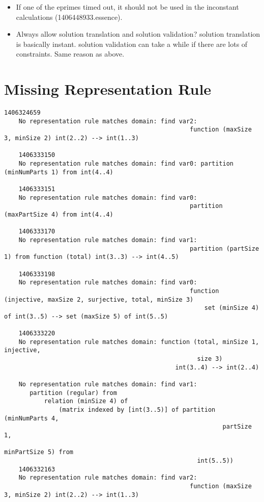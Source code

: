 \begin{itemize}
	\item If one of the eprimes timed out, it should not be used in the inconstant calculations (1406448933.essence).
	\item Always allow solution translation and solution validation?  solution translation is basically instant. solution validation can take a while if there are lots of constraints.  Same reason as above. 
\end{itemize}

\section{Missing Representation Rule}

\begin{lstlisting}[breaklines=True]
	1406324659
    No representation rule matches domain: find var2:
                                                   function (maxSize 3, minSize 2) int(2..2) --> int(1..3)

    1406333150
    No representation rule matches domain: find var0: partition (minNumParts 1) from int(4..4)

    1406333151
    No representation rule matches domain: find var0:
                                                   partition (maxPartSize 4) from int(4..4)

    1406333170
    No representation rule matches domain: find var1:
                                                   partition (partSize 1) from function (total) int(3..3) --> int(4..5)

    1406333198												   
    No representation rule matches domain: find var0:
                                                   function (injective, maxSize 2, surjective, total, minSize 3)
                                                       set (minSize 4) of int(3..5) --> set (maxSize 5) of int(5..5)

    1406333220
    No representation rule matches domain: function (total, minSize 1, injective,
                                                     size 3)
                                               int(3..4) --> int(2..4)

    No representation rule matches domain: find var1:
       partition (regular) from
           relation (minSize 4) of
               (matrix indexed by [int(3..5)] of partition (minNumParts 4,
                                                            partSize 1,
                                                            minPartSize 5) from
                                                     int(5..5))              
    1406332163
    No representation rule matches domain: find var2:
                                                   function (maxSize 3, minSize 2) int(2..2) --> int(1..3)

\end{lstlisting}






